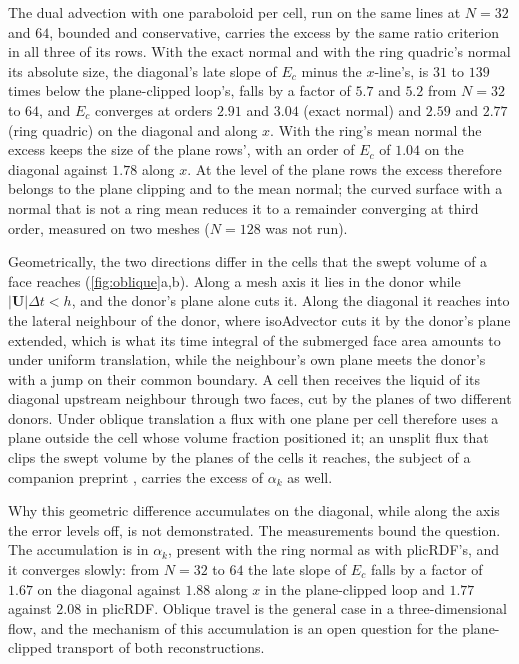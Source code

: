 \documentclass[preprint,12pt]{elsarticle}
\begin{document}
The dual advection with one paraboloid per cell, run on the same lines at $N = 32$ and $64$, bounded and conservative, carries the excess by the same ratio criterion in all three of its rows. With the exact normal and with the ring quadric's normal its absolute size, the diagonal's late slope of $E_c$ minus the $x$-line's, is $31$ to $139$ times below the plane-clipped loop's, falls by a factor of $5.7$ and $5.2$ from $N = 32$ to $64$, and $E_c$ converges at orders $2.91$ and $3.04$ (exact normal) and $2.59$ and $2.77$ (ring quadric) on the diagonal and along $x$. With the ring's mean normal the excess keeps the size of the plane rows', with an order of $E_c$ of $1.04$ on the diagonal against $1.78$ along $x$. At the level of the plane rows the excess therefore belongs to the plane clipping and to the mean normal; the curved surface with a normal that is not a ring mean reduces it to a remainder converging at third order, measured on two meshes ($N = 128$ was not run).

Geometrically, the two directions differ in the cells that the swept volume of a face reaches (\cref{fig:oblique}a,b). Along a mesh axis it lies in the donor while $|\mathbf{U}|\Delta t < h$, and the donor's plane alone cuts it. Along the diagonal it reaches into the lateral neighbour of the donor, where isoAdvector cuts it by the donor's plane extended, which is what its time integral of the submerged face area amounts to under uniform translation, while the neighbour's own plane meets the donor's with a jump on their common boundary. A cell then receives the liquid of its diagonal upstream neighbour through two faces, cut by the planes of two different donors. Under oblique translation a flux with one plane per cell therefore uses a plane outside the cell whose volume fraction positioned it; an unsplit flux that clips the swept volume by the planes of the cells it reaches, the subject of a companion preprint \citep{MaricSweptAdvection2026}, carries the excess of $\alpha_k$ as well.

Why this geometric difference accumulates on the diagonal, while along the axis the error levels off, is not demonstrated. The measurements bound the question. The accumulation is in $\alpha_k$, present with the ring normal as with plicRDF's, and it converges slowly: from $N = 32$ to $64$ the late slope of $E_c$ falls by a factor of $1.67$ on the diagonal against $1.88$ along $x$ in the plane-clipped loop and $1.77$ against $2.08$ in plicRDF. Oblique travel is the general case in a three-dimensional flow, and the mechanism of this accumulation is an open question for the plane-clipped transport of both reconstructions.
\end{document}
